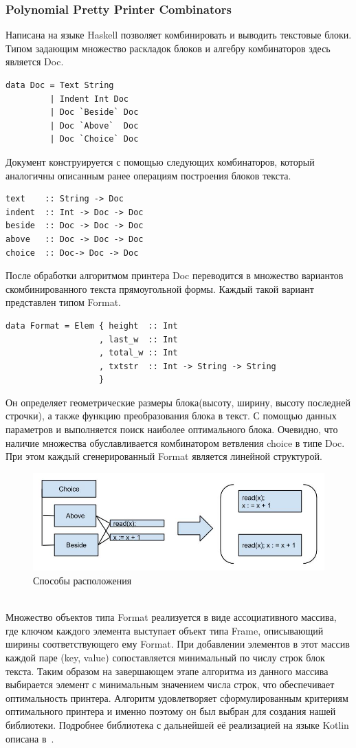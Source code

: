 \documentclass{matmex-diploma}
\begin{document}
\subsubsection{Polynomial Pretty Printer Combinators}
Написана на языке Haskell позволяет комбинировать и выводить текстовые блоки. Типом задающим множество раскладок блоков и  алгебру комбинаторов здесь является Doc.
\begin{lstlisting}
data Doc = Text String
         | Indent Int Doc
         | Doc `Beside` Doc
         | Doc `Above`  Doc
         | Doc `Choice` Doc
\end{lstlisting}
Документ конструируется с помощью следующих комбинаторов, который аналогичны описанным ранее операциям построения блоков текста.
\begin{lstlisting}
text    :: String -> Doc
indent  :: Int -> Doc -> Doc
beside  :: Doc -> Doc -> Doc
above   :: Doc -> Doc -> Doc
choice  :: Doc-> Doc -> Doc
\end{lstlisting}
После обработки алгоритмом принтера Doc переводится в множество вариантов скомбинированного текста прямоугольной формы. Каждый такой вариант представлен типом Format.
\begin{lstlisting}
data Format = Elem { height  :: Int
                   , last_w  :: Int
                   , total_w :: Int
                   , txtstr  :: Int -> String -> String
                   }
\end{lstlisting}
Он определяет геометрические размеры блока(высоту, ширину, высоту последней строчки), а также функцию преобразования блока в текст.  С помощью данных параметров и выполняется поиск наиболее оптимального блока. Очевидно, что наличие множества обуславливается комбинатором ветвления choice в типе Doc. При этом  каждый сгенерированный Format является линейной структурой.
\begin{figure}[h]
    \centering
    \includegraphics[scale=0.7]{Images/image15.png}
    \caption{Способы расположения}
\end{figure}
\\Множество объектов типа Format реализуется в виде ассоциативного массива, где ключом каждого элемента выступает объект типа Frame, описывающий ширины соответствующего ему Format. При добавлении элементов в этот массив каждой паре (key, value) сопоставляется минимальный по числу строк блок текста. Таким образом на завершающем этапе алгоритма из данного массива выбирается элемент с минимальным значением числа строк, что обеспечивает оптимальность принтера. 
Алгоритм удовлетворяет сформулированным критериям оптимального принтера и именно поэтому он был выбран для создания нашей библиотеки.
Подробнее библиотека с дальнейшей её реализацией на языке Kotlin описана в~\cite{podkopaevD}.
\end{document}

